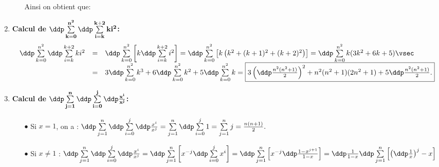 \begin{correction}
\begin{enumerate}
\begin{itemize}
Ainsi on obtient que: 
\end{itemize}
\item  \textbf{Calcul de $\mathbf{\ddp \sum\limits_{k=0}^{n^2}\ddp \sum\limits_{i=k}^{k+2} ki^2}$:}
$$\begin{array}{lll}
\ddp \sum\limits_{k=0}^{n^2}\ddp \sum\limits_{i=k}^{k+2} ki^2 &=& \ddp \sum\limits_{k=0}^{n^2} \left\lbrack k \ddp \sum\limits_{i=k}^{k+2} i^2 \right\rbrack
= \ddp \sum\limits_{k=0}^{n^2} \left\lbrack k \left(  k^2+(k+1)^2+(k+2)^2  \right) \right\rbrack
=\ddp \sum\limits_{k=0}^{n^2}  k (3k^2+6k+5)\vsec\\
&=& 3\ddp \sum\limits_{k=0}^{n^2} k^3  +6\ddp \sum\limits_{k=0}^{n^2} k^2+5\ddp \sum\limits_{k=0}^{n^2} k
=\fbox{$3\left(  \ddp\frac{ n^2(n^2+1) }{ 2 }  \right)^2+n^2(n^2+1)(2n^2+1)+5\ddp\frac{n^2(n^2+1)}{2} $.}\end{array}$$
\item  \textbf{Calcul de $\mathbf{\ddp \sum\limits_{j=1}^n\ddp \sum\limits_{i=0}^j \ddp\frac{ x^{i} }{  x^j }}$:}
\begin{itemize}
\item[$\bullet$] Si $x=1$, on a : $\ddp \sum\limits_{j=1}^n\ddp \sum\limits_{i=0}^j \ddp\frac{ x^{i} }{  x^j } = \sum\limits_{j=1}^n\ddp \sum\limits_{i=0}^j 1 = \sum\limits_{j=1}^n j = \frac{n(n+1)}{2}.$ 
\item[$\bullet$] Si $x\not= 1$ :
\noindent $\ddp \sum\limits_{j=1}^n\ddp \sum\limits_{i=0}^j \ddp\frac{ x^{i} }{  x^j }=\ddp \sum\limits_{j=1}^n\left\lbrack x^{-j} \ddp \sum\limits_{i=0}^j x^{i}  \right\rbrack=
\ddp \sum\limits_{j=1}^n\left\lbrack x^{-j}  \ddp\frac{1-x^{j+1}}{1-x}  \right\rbrack= \ddp\frac{1}{1-x}\ddp \sum\limits_{j=1}^n \left\lbrack \left( \ddp\frac{1}{x}\right)^j-x  \right\rbrack$
\begin{center}
\end{center}


\end{itemize}
\end{enumerate}
\end{correction}
